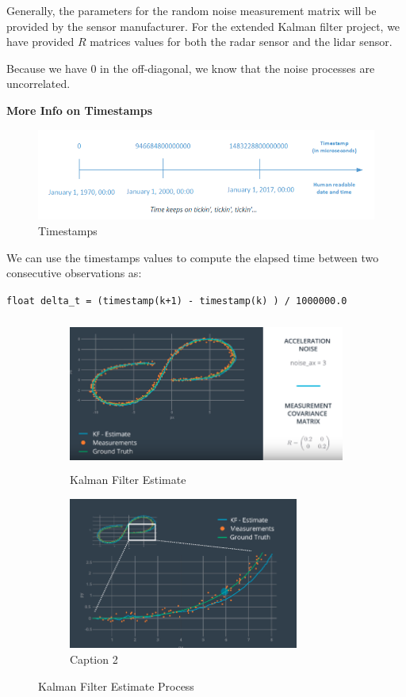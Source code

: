 \documentclass[11pt, a4paper]{article}
\begin{document}
Generally, the parameters for the random noise measurement matrix will be provided by the sensor manufacturer. For the extended Kalman filter project, we have provided $R$ matrices values for both the radar sensor and the lidar sensor. 


Because we have 0 in the off-diagonal, we know that the noise processes are uncorrelated.




\textbf{More Info on Timestamps} \\




\begin{figure}[htpb!]
	\centering
	\includegraphics[width=0.8\linewidth]{timestamps}
	\caption{Timestamps}
	\label{fig:Timestamps}
\end{figure}


We can use the timestamps values to compute the elapsed time between two consecutive observations as:

\texttt{float delta\_t = (timestamp(k+1) - timestamp(k) ) / 1000000.0 } 


\begin{figure}[h!]
 
\begin{subfigure}{0.5\textwidth}
\includegraphics[width=0.9\linewidth, height=5cm]{KF_estimate_0} 
\caption{Kalman Filter Estimate}
\label{fig:subim1}
\end{subfigure}
\begin{subfigure}{0.5\textwidth}
\includegraphics[width=0.9\linewidth, height=5cm]{KF_estimate}
\caption{Caption 2}
\label{fig:subim2}
\end{subfigure}
 
\caption{Kalman Filter Estimate Process}
\label{fig:image2}
\end{figure}
\end{document}
